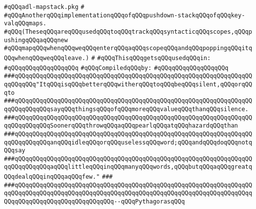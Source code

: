 \label{src/lib/compiler/back/low/tools/arch/adl-mapstack.pkg}
\verb|#qQQqadl-mapstack.pkg|\newline
\verb|#|\newline
\verb|#qQQqAnotherqQQqimplementationqQQqofqQQqpushdown-stackqQQqofqQQqkey-valqQQqmaps.|\newline
\verb|#qQQq(TheseqQQqareqQQqusedqQQqtoqQQqtrackqQQqsyntacticqQQqscopes,qQQqpushingqQQqaqQQqnew|\newline
\verb|#qQQqmapqQQqwhenqQQqweqQQqenterqQQqaqQQqscopeqQQqandqQQqpoppingqQQqitqQQqwhenqQQqweqQQqleave.)|\newline
\verb|#|\newline
\verb|#qQQqThisqQQqgetsqQQqusedqQQqin:|\newline
\verb|#qQQqqQQqqQQqqQQqqQQq|\newline
\newline
\verb|#qQQqCompiledqQQqby:|\newline
\verb|#qQQqqQQqqQQqqQQqqQQq|\newline
\newline
\newline
\newline
\verb|###qQQqqQQqqQQqqQQqqQQqqQQqqQQqqQQqqQQqqQQqqQQqqQQqqQQqqQQqqQQqqQQqqQQqqQQqqQQq"ItqQQqisqQQqbetterqQQqwitherqQQqtoqQQqbeqQQqsilent,qQQqorqQQqto|\newline
\verb|###qQQqqQQqqQQqqQQqqQQqqQQqqQQqqQQqqQQqqQQqqQQqqQQqqQQqqQQqqQQqqQQqqQQqqQQqqQQqqQQqsayqQQqthingsqQQqofqQQqmoreqQQqvalueqQQqthanqQQqsilence.|\newline
\verb|###qQQqqQQqqQQqqQQqqQQqqQQqqQQqqQQqqQQqqQQqqQQqqQQqqQQqqQQqqQQqqQQqqQQqqQQqqQQqqQQqSoonerqQQqthrowqQQqaqQQqpearlqQQqatqQQqhazardqQQqthan|\newline
\verb|###qQQqqQQqqQQqqQQqqQQqqQQqqQQqqQQqqQQqqQQqqQQqqQQqqQQqqQQqqQQqqQQqqQQqqQQqqQQqqQQqanqQQqidleqQQqorqQQquselessqQQqword;qQQqandqQQqdoqQQqnotqQQqsay|\newline
\verb|###qQQqqQQqqQQqqQQqqQQqqQQqqQQqqQQqqQQqqQQqqQQqqQQqqQQqqQQqqQQqqQQqqQQqqQQqqQQqqQQqaqQQqlittleqQQqinqQQqmanyqQQqwords,qQQqbutqQQqaqQQqgreatqQQqdealqQQqinqQQqaqQQqfew."|\newline
\verb|###|\newline
\verb|###qQQqqQQqqQQqqQQqqQQqqQQqqQQqqQQqqQQqqQQqqQQqqQQqqQQqqQQqqQQqqQQqqQQqqQQqqQQqqQQqqQQqqQQqqQQqqQQqqQQqqQQqqQQqqQQqqQQqqQQqqQQqqQQqqQQqqQQqqQQqqQQqqQQqqQQqqQQqqQQqqQQqqQQq--qQQqPythagorasqQQq|\newline
